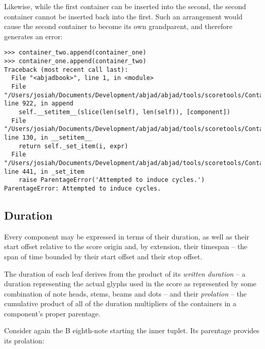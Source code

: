 Likewise, while the first container can be inserted into the second, the second
container cannot be inserted back into the first. Such an arrangement would
cause the second container to become its own grandparent, and therefore
generates an error:

\begin{comment}
<abjad>[allow_exceptions]
container_two.append(container_one)
container_one.append(container_two)
</abjad>
\end{comment}

\begin{abjadbookoutput}
\begin{singlespacing}
\vspace{-0.5\baselineskip}
\begin{lstlisting}
>>> container_two.append(container_one)
>>> container_one.append(container_two)
Traceback (most recent call last):
  File "<abjadbook>", line 1, in <module>
  File "/Users/josiah/Documents/Development/abjad/abjad/tools/scoretools/Container.py", line 922, in append
    self.__setitem__(slice(len(self), len(self)), [component])
  File "/Users/josiah/Documents/Development/abjad/abjad/tools/scoretools/Container.py", line 130, in __setitem__
    return self._set_item(i, expr)
  File "/Users/josiah/Documents/Development/abjad/abjad/tools/scoretools/Container.py", line 441, in _set_item
    raise ParentageError('Attempted to induce cycles.')
ParentageError: Attempted to induce cycles.
\end{lstlisting}
\end{singlespacing}
\end{abjadbookoutput}

\subsection{Duration}

Every component may be expressed in terms of their duration, as well as their
start offset relative to the score origin and, by extension, their timespan --
the span of time bounded by their start offset and their stop offset.

The duration of each leaf derives from the product of its \emph{written
duration} -- a duration representing the actual glyphs used in the score as
represented by some combination of note heads, stems, beams and dots -- and
their \emph{prolation} -- the cumulative product of all of the duration
multipliers of the containers in a component's proper parentage.

Consider again the B eighth-note starting the inner tuplet. Its parentage
provides its prolation:

